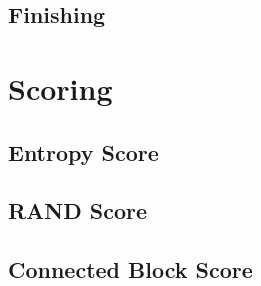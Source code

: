 		\subsection{Finishing}
	
	\section{Scoring}
	
		\subsection{Entropy Score}

		\subsection{RAND Score}

		\subsection{Connected Block Score}
